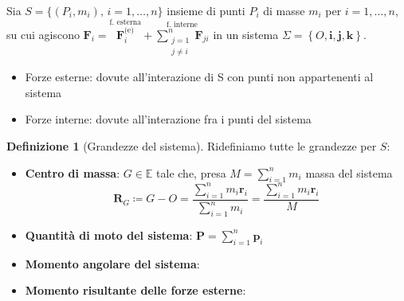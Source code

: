 \documentclass[a4paper,10pt]{article}
\theoremstyle{definition}
\newcommand{\bv}{\boldsymbol} %
\theoremstyle{indentdefinition}
\newtheorem{defn}{Definizione}[section]
\theoremstyle{indenttheorem}
\theoremstyle{myremark}
\theoremstyle{indentgeneral}
\begin{document}
Sia $S=\{(P_i,m_i),\,i=1,\dots, n\}$ insieme di punti $P_{i}$ di masse $m_{i}$ per $i=1,\ldots,n$, su cui agiscono
$\boldsymbol{F}_{i}=\overset{\text{f. esterna}}{\boldsymbol{F}_{i}^{\text{(e)}}}+\overset{\text{f. interne}}{\sum_{\substack{j=1\\
j\neq i
}
}^{n}\boldsymbol{F}_{ji}}$ in un sistema $\Sigma=\left\{ O,\boldsymbol{i},\boldsymbol{j},\boldsymbol{k}\right\} $.
\begin{itemize}
    \item Forze esterne: dovute all'interazione di S con punti non appartenenti al sistema
    \item Forze interne: dovute all'interazione fra i punti del sistema
\end{itemize}

\begin{defn}[Grandezze del sistema] Ridefiniamo tutte le grandezze per $S$:
\begin{itemize}
    \item \textbf{Centro di massa}: $G\in\mathbb{E}$ tale che, presa $M=\sum_{i=1}^{n}m_{i}$
massa del sistema
\[
\boldsymbol{R}_{G}\coloneqq G-O=\frac{\sum_{i=1}^{n}m_{i}\boldsymbol{r}_{i}}{\sum_{i=1}^{n}m_{i}}=\frac{\sum_{i=1}^{n}m_{i}\boldsymbol{r}_{i}}{M}
\]
\item \textbf{Quantità di moto del sistema}: $\bv{P}=\sum_{i=1}^n\bv{p}_i$
\item \textbf{Momento angolare del sistema}:
\item \textbf{Momento risultante delle forze esterne}:
\end{itemize}

\end{defn}
\end{document}
